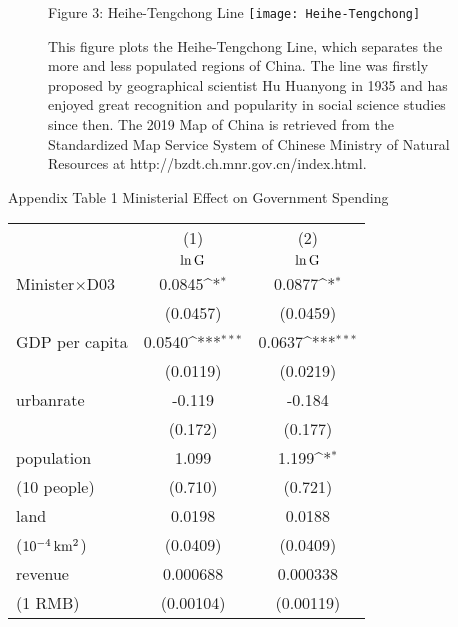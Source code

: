 \documentclass[11pt,a4paper]{article}
\begin{document}
\newpage


\begin{figure}[htb]
\centering
Figure 3: Heihe-Tengchong Line
\texttt{[image: Heihe-Tengchong]}
\caption{This figure plots the Heihe-Tengchong Line, which separates the more and less populated regions of China. The line was firstly proposed by geographical scientist Hu Huanyong in 1935 and has enjoyed great recognition and popularity in social science studies since then. The 2019 Map of China is retrieved from the Standardized Map Service System of Chinese Ministry of Natural Resources at http://bzdt.ch.mnr.gov.cn/index.html.}
\end{figure}

\newpage


\begin{center}
Appendix Table 1 Ministerial Effect on Government Spending\\
\medskip
\begin{scriptsize}
{
\def\sym#1{\ifmmode^{#1}\else\(^{#1}\)\fi}
\begin{tabular}{l*{2}{c}}
\hline\hline
            &\multicolumn{1}{c}{(1)}&\multicolumn{1}{c}{(2)}\\
            &\multicolumn{1}{c}{\(\rm \ln{G}  \)}&\multicolumn{1}{c}{\(\rm \ln{G}  \)}\\
\hline
Minister$\times$D03       &      0.0845\sym{*}  &      0.0877\sym{*}  \\
            &    (0.0457)         &    (0.0459)         \\
[1em]
GDP per capita &      0.0540\sym{***}&      0.0637\sym{***}\\
            &    (0.0119)         &    (0.0219)         \\
[1em]
urbanrate   &      -0.119         &      -0.184         \\
            &     (0.172)         &     (0.177)         \\
[1em]
population      &       1.099         &       1.199\sym{*}  \\
(10 people)             &     (0.710)         &     (0.721)         \\
[1em]
land       &      0.0198         &      0.0188         \\
(${\rm 10^{-4} \, km^{2}}$)               &    (0.0409)         &    (0.0409)         \\
[1em]
revenue  &    0.000688         &    0.000338         \\
(1 RMB)
            &   (0.00104)         &   (0.00119)         \\

\end{tabular}}
\end{scriptsize}
\end{center}
\end{document}
